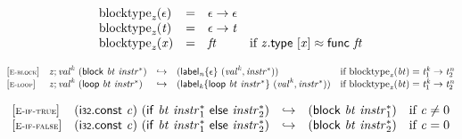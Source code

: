 \vspace{1ex}

$$
\begin{array}{@{}lcl@{}l@{}}
{{\mathrm{blocktype}}}_{{\mathit{z}}}(\epsilon) &=& \epsilon \rightarrow \epsilon &  \\
{{\mathrm{blocktype}}}_{{\mathit{z}}}({\mathit{t}}) &=& \epsilon \rightarrow {\mathit{t}} &  \\
{{\mathrm{blocktype}}}_{{\mathit{z}}}({\mathit{x}}) &=& {\mathit{ft}} &\quad
  \mbox{if}~{\mathit{z}}.\mathsf{type}~[{\mathit{x}}] \approx \mathsf{func}~{\mathit{ft}} \\
\end{array}
$$

$$
\begin{array}{@{}l@{}lcl@{}l@{}}
{[\textsc{\scriptsize E{-}block}]} \quad & {\mathit{z}} ; {{\mathit{val}}^{{\mathit{k}}}}~(\mathsf{block}~{\mathit{bt}}~{{\mathit{instr}}^\ast}) &\hookrightarrow& ({{\mathsf{label}}_{{\mathit{n}}}}{\{\epsilon\}}~({{\mathit{val}}^{{\mathit{k}}}}, {{\mathit{instr}}^\ast})) &\quad
  \mbox{if}~{{\mathrm{blocktype}}}_{{\mathit{z}}}({\mathit{bt}}) = {{\mathit{t}}_{{1}}^{{\mathit{k}}}} \rightarrow {{\mathit{t}}_{{2}}^{{\mathit{n}}}} \\
{[\textsc{\scriptsize E{-}loop}]} \quad & {\mathit{z}} ; {{\mathit{val}}^{{\mathit{k}}}}~(\mathsf{loop}~{\mathit{bt}}~{{\mathit{instr}}^\ast}) &\hookrightarrow& ({{\mathsf{label}}_{{\mathit{k}}}}{\{\mathsf{loop}~{\mathit{bt}}~{{\mathit{instr}}^\ast}\}}~({{\mathit{val}}^{{\mathit{k}}}}, {{\mathit{instr}}^\ast})) &\quad
  \mbox{if}~{{\mathrm{blocktype}}}_{{\mathit{z}}}({\mathit{bt}}) = {{\mathit{t}}_{{1}}^{{\mathit{k}}}} \rightarrow {{\mathit{t}}_{{2}}^{{\mathit{n}}}} \\
\end{array}
$$

$$
\begin{array}{@{}l@{}lcl@{}l@{}}
{[\textsc{\scriptsize E{-}if{-}true}]} \quad & (\mathsf{i{\scriptstyle32}}.\mathsf{const}~{\mathit{c}})~(\mathsf{if}~{\mathit{bt}}~{{\mathit{instr}}_{{1}}^\ast}~\mathsf{else}~{{\mathit{instr}}_{{2}}^\ast}) &\hookrightarrow& (\mathsf{block}~{\mathit{bt}}~{{\mathit{instr}}_{{1}}^\ast}) &\quad
  \mbox{if}~{\mathit{c}} \neq 0 \\
{[\textsc{\scriptsize E{-}if{-}false}]} \quad & (\mathsf{i{\scriptstyle32}}.\mathsf{const}~{\mathit{c}})~(\mathsf{if}~{\mathit{bt}}~{{\mathit{instr}}_{{1}}^\ast}~\mathsf{else}~{{\mathit{instr}}_{{2}}^\ast}) &\hookrightarrow& (\mathsf{block}~{\mathit{bt}}~{{\mathit{instr}}_{{2}}^\ast}) &\quad
  \mbox{if}~{\mathit{c}} = 0 \\
\end{array}
$$

